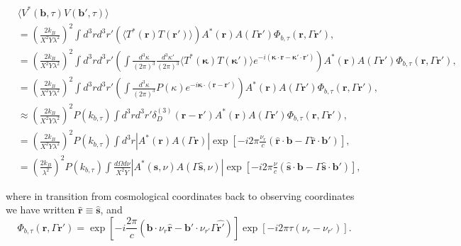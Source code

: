 \documentclass[twocolumn,apj,numberedappendix]{emulateapj}
\renewcommand\[{\begin{equation}}
\renewcommand\]{\end{equation}}
\begin{document}
\begin{widetext}
\begin{equation}
\begin{aligned} & \langle V^{*}(\boldsymbol{b},\tau)V(\boldsymbol{b'},\tau)\rangle\\
 & =\left(\frac{2k_{B}}{X^{2}Y\lambda^{2}}\right)^{2}\int d^{3}rd^{3}r'\left(\langle T^{*}(\boldsymbol{r})T(\boldsymbol{r'})\rangle\right)A^{*}(\boldsymbol{r})A(\Gamma \boldsymbol{r'})\Phi_{b,\tau}(\boldsymbol{r},\Gamma \boldsymbol{r'}),\\
 & =\left(\frac{2k_{B}}{X^{2}Y\lambda^{2}}\right)^{2}\int d^{3}rd^{3}r'\left(\int\frac{d^{3}\kappa}{(2\pi)^{3}}\frac{d^{3}\kappa'}{(2\pi)^{3}}\langle T^{*}(\boldsymbol{\kappa})T(\boldsymbol{\kappa'})\rangle e^{-i(\boldsymbol{\kappa}\cdot \boldsymbol{r}-\boldsymbol{\kappa'}\cdot\boldsymbol{r'})}\right)A^{*}(\boldsymbol{r})A(\Gamma \boldsymbol{r'})\Phi_{b,\tau}(\boldsymbol{r},\Gamma \boldsymbol{r'}),\\
 & =\left(\frac{2k_{B}}{X^{2}Y\lambda^{2}}\right)^{2}\int d^{3}rd^{3}r'\left(\int\frac{d^{3}\kappa}{(2\pi)^{3}}P(\kappa)e^{-i\boldsymbol{\kappa}\cdot(\boldsymbol{r}-\boldsymbol{r'})}\right)A^{*}(\boldsymbol{r})A(\Gamma \boldsymbol{r'})\Phi_{b,\tau}(\boldsymbol{r},\Gamma \boldsymbol{r'}),\\
 & \approx\left(\frac{2k_{B}}{X^{2}Y\lambda^{2}}\right)^{2}P(k_{b,\tau})\int d^{3}rd^{3}r'\delta_{D}^{(3)}(\boldsymbol{r}-\boldsymbol{r'})A^{*}(\boldsymbol{r})A(\Gamma \boldsymbol{r'})\Phi_{b,\tau}(\boldsymbol{r},\Gamma \boldsymbol{r'}),\\
 & =\left(\frac{2k_{B}}{X^{2}Y\lambda^{2}}\right)^{2}P(k_{b,\tau})\int d^{3}r|A^{*}(\boldsymbol{r})A(\Gamma \boldsymbol{r})|\exp\left[-i2\pi\frac{\nu_{r}}{c}\left(\hat{\boldsymbol{r}}\cdot\boldsymbol{b}-\Gamma \hat{\boldsymbol{r}}\cdot\boldsymbol{b'}\right)\right],\\
 & =\left(\frac{2k_{B}}{\lambda^{2}}\right)^{2}P(k_{b,\tau})\int\frac{d\Omega d\nu}{X^{2}Y}|A^{*}(\hat{\boldsymbol{s}},\nu)A(\Gamma \hat{\boldsymbol{s}},\nu)|\exp\left[-i2\pi\frac{\nu}{c}\left(\hat{\boldsymbol{s}}\cdot\boldsymbol{b}-\Gamma\hat{\boldsymbol{s}}\cdot\boldsymbol{b'}\right)\right],
\end{aligned}
\label{eq:main}
\end{equation}

where in transition from cosmological coordinates back to observing coordinates we have written $\hat{\boldsymbol{r}}\equiv\hat{\boldsymbol{s}}$, and 
\begin{equation}
\Phi_{b,\tau}(\boldsymbol{r},\Gamma \boldsymbol{r'})=\exp\left[-i\frac{2\pi}{c}\left(\boldsymbol{b}\cdot\nu_{r}\hat{\boldsymbol{r}}-\boldsymbol{b'}\cdot\nu_{r'}\Gamma\hat{\boldsymbol{r'}}\right)\right]\exp\left[-i2\pi\tau\left(\nu_{r}-\nu_{r'}\right)\right].
\end{equation}
\end{widetext}
\end{document}
